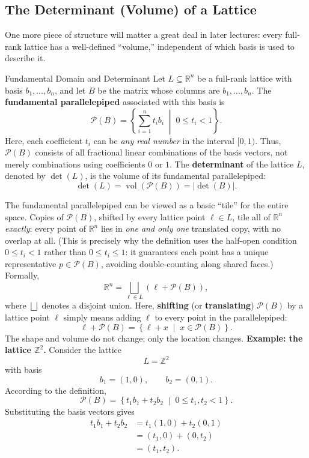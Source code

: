 \subsection{The Determinant (Volume) of a Lattice}
\label{sec:L1:the-determinant-volume-of-a-lattice}
One more piece of structure will matter a great deal in later lectures:
every full-rank lattice has a well-defined ``volume,'' independent of
which basis is used to describe it.
\begin{defbox}{Fundamental Domain and Determinant}
Let $L \subseteq \mathbb{R}^n$ be a full-rank lattice with basis
$b_1,\ldots,b_n$, and let $B$ be the matrix whose columns are
$b_1,\ldots,b_n$. The \textbf{fundamental parallelepiped} associated
with this basis is
\[
\mathcal{P}(B)
=
\left\{
\sum_{i=1}^n t_i b_i
\;\middle|\;
0 \leq t_i < 1
\right\}.
\]
Here, each coefficient $t_i$ can be \emph{any real number} in the
interval $[0,1)$. Thus, $\mathcal{P}(B)$ consists of all fractional
linear combinations of the basis vectors, not merely combinations
using coefficients $0$ or $1$.
The \textbf{determinant} of the lattice $L$, denoted by $\det(L)$, is
the volume of its fundamental parallelepiped:
\[
\det(L)
=
\operatorname{vol}(\mathcal{P}(B))
=
|\det(B)|.
\]
\end{defbox}
The fundamental parallelepiped can be viewed as a basic ``tile'' for
the entire space. Copies of $\mathcal{P}(B)$, shifted by every lattice
point $\ell\in L$, tile all of $\mathbb{R}^n$ \emph{exactly}: every
point of $\mathbb{R}^n$ lies in \emph{one and only one} translated
copy, with no overlap at all. (This is precisely why the definition
uses the half-open condition $0 \le t_i < 1$ rather than
$0 \le t_i \le 1$: it guarantees each point has a unique
representative $p \in \mathcal{P}(B)$, avoiding double-counting along
shared faces.) Formally,
\[
\mathbb{R}^n
=
\bigsqcup_{\ell\in L}
\left(\ell+\mathcal{P}(B)\right),
\]
where $\bigsqcup$ denotes a disjoint union.
Here, \textbf{shifting} (or \textbf{translating}) $\mathcal{P}(B)$ by
a lattice point $\ell$ simply means adding $\ell$ to every point in
the parallelepiped:
\[
\ell+\mathcal{P}(B)
=
\left\{
\ell+x
\;\middle|\;
x\in\mathcal{P}(B)
\right\}.
\]
The shape and volume do not change; only the location changes.
\medskip
\noindent
\textbf{Example: the lattice $\mathbb{Z}^2$.}
Consider the lattice
\[
L=\mathbb{Z}^2
\]
with basis
\[
b_1=(1,0),
\qquad
b_2=(0,1).
\]
According to the definition,
\[
\mathcal{P}(B)
=
\left\{
t_1b_1+t_2b_2
\;\middle|\;
0\leq t_1,t_2<1
\right\}.
\]
Substituting the basis vectors gives
\[
\begin{aligned}
t_1b_1+t_2b_2
&=
t_1(1,0)+t_2(0,1)\\
&=
(t_1,0)+(0,t_2)\\
&=
(t_1,t_2).
\end{aligned}
\]
